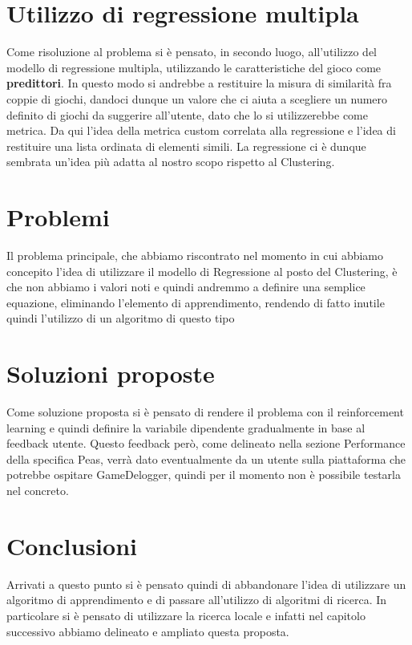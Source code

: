 \section{Utilizzo di regressione multipla}
Come risoluzione al problema si è pensato, in secondo luogo, all'utilizzo del modello di regressione multipla, utilizzando le caratteristiche del gioco come \textbf{predittori}. In questo modo si andrebbe a restituire la misura di similarità fra coppie di giochi, dandoci dunque un valore che ci aiuta a scegliere un numero definito di giochi da suggerire all'utente, dato che lo si utilizzerebbe come metrica. Da qui l'idea della metrica custom correlata alla regressione e l'idea di restituire una lista ordinata di elementi simili. La regressione ci è dunque sembrata un'idea più adatta al nostro scopo rispetto al Clustering. 


\section{Problemi}
Il problema principale, che abbiamo riscontrato nel momento in cui abbiamo concepito l'idea di utilizzare il modello di Regressione al posto del Clustering, è che non abbiamo i valori noti e quindi andremmo a definire una semplice equazione, eliminando l'elemento di apprendimento, rendendo di fatto inutile quindi l'utilizzo di un algoritmo di questo tipo


\section{Soluzioni proposte}
Come soluzione proposta si è pensato di rendere il problema con il  reinforcement learning e quindi definire la variabile dipendente gradualmente in base al feedback utente. Questo feedback però, come delineato nella sezione Performance della specifica Peas, verrà dato eventualmente da un utente sulla piattaforma che potrebbe ospitare GameDelogger, quindi per il momento non è possibile testarla nel concreto.

\section{Conclusioni}
Arrivati a questo punto si è pensato quindi di abbandonare l'idea di utilizzare un algoritmo di apprendimento e di passare all'utilizzo di algoritmi di ricerca. In particolare si è pensato di utilizzare la ricerca locale e infatti nel capitolo successivo abbiamo delineato e ampliato questa proposta.